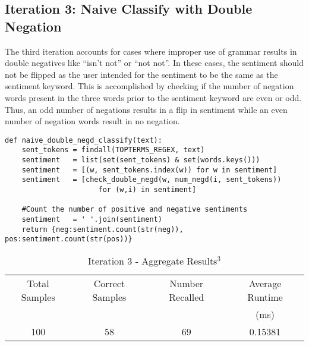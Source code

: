 \subsection{Iteration 3: Naive Classify with Double Negation} %
\label{sub:iteration_3_naive_classify_with_double_negation}
    The third iteration accounts for cases where improper use of grammar results in double negatives like ``isn't not'' or ``not not''.  In these cases, the sentiment should not be flipped as the user intended for the sentiment to be the same as the sentiment keyword. This is accomplished by checking if the number of negation words present in the three words prior to the sentiment keyword are even or odd.  Thus, an odd number of negations results in a flip in sentiment while an even number of negation words result in no negation.\\
     
	\begin{lstlisting}[caption={\textit{utils.py}: code fragment for naive classify with double negation}]
def naive_double_negd_classify(text):
    sent_tokens = findall(TOPTERMS_REGEX, text)
    sentiment   = list(set(sent_tokens) & set(words.keys()))
    sentiment   = [(w, sent_tokens.index(w)) for w in sentiment]
    sentiment   = [check_double_negd(w, num_negd(i, sent_tokens))
                      for (w,i) in sentiment]

    #Count the number of positive and negative sentiments
    sentiment   = ' '.join(sentiment)
    return {neg:sentiment.count(str(neg)), pos:sentiment.count(str(pos))}
	\end{lstlisting}

	\begin{table}[htp]
		\centering
		\caption{Iteration 3 - Aggregate Results$^3$}
		\begin{tabular}{cccc}
			\toprule
Total Samples	& Correct Samples	& Number Recalled   & Average Runtime\\
				&					&                   & (ms)\\
			\toprule
100             & 58                & 69                & 0.15381 \\
			\bottomrule
		\end{tabular}
		\label{tab:iter_3_aggregate_results}
	\end{table}

